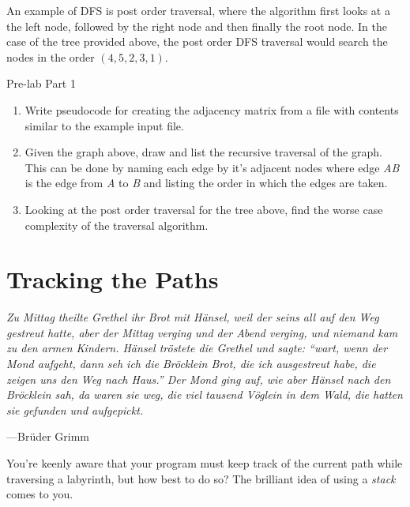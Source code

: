 \documentclass[11pt]{article}
\begin{document}
An example of DFS is post order traversal, where the algorithm first looks at a the left node, followed by the right node and then finally the root node. In the case of the tree provided above, the post order DFS traversal would search the nodes in the order $(4, 5, 2, 3, 1)$.  

\begin{prelab}{Pre-lab Part 1}
    \begin{enumerate}
        \item Write pseudocode for creating the adjacency matrix from a file
            with contents similar to the example input file.
        \item Given the graph above, draw and list the recursive traversal of
            the graph.  This can be done by naming each edge by it's adjacent
            nodes where edge \textit{AB} is the edge from \textit{A} to
            \textit{B} and listing the order in which the edges are taken.
        \item Looking at the post order traversal for the tree above, find the worse case complexity of the traversal algorithm. 
    \end{enumerate}
\end{prelab}

\section{Tracking the Paths}
\textwidth \epigraph{\emph{ Zu Mittag theilte Grethel ihr Brot
        mit H\"ansel, weil der seins all auf den Weg gestreut hatte, aber der
        Mittag verging und der Abend verging, und niemand kam zu den armen
        Kindern. H\"ansel tr\"ostete die Grethel und sagte: ``wart, wenn der
        Mond aufgeht, dann seh ich die Br\"ocklein Brot, die ich ausgestreut
        habe, die zeigen uns den Weg nach Haus.'' Der Mond ging auf, wie aber
        H\"ansel nach den Br\"ocklein sah, da waren sie weg, die viel tausend
        V\"oglein in dem Wald, die hatten sie gefunden und
aufgepickt.}}{---Br\"uder Grimm}


\noindent
You're keenly aware that your program must keep track of the current path while
traversing a labyrinth, but how best to do so? The brilliant idea of using a
\emph{stack} comes to you.
\end{document}
